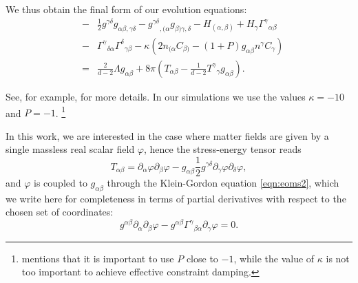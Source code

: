 \documentclass[a4paper,11pt]{article}
\numberwithin{equation}{section}
\begin{document}
We thus obtain the final form of our evolution equations:
\begin{eqnarray}
\label{eqn:efe_gh_modified}
&-& \frac{1}{2} g^{\gamma \delta} g_{\alpha\beta, \gamma \delta} - 
{g^{\gamma\delta}}_{,(\alpha} g_{\beta) \gamma, \delta} - H_{(\alpha, \beta)} + H_\gamma {\Gamma^\gamma}_{\alpha\beta} \nonumber \\
&-& {\Gamma^\gamma}_{\delta \alpha} {\Gamma^\delta}_{\gamma \beta} - \kappa \left( 2 n_{(\alpha} C_{\beta)} - (1+P) g_{\alpha\beta} n^\gamma 
C_\gamma \right) \nonumber \\
&=&   \frac{2}{d-2} \Lambda g_{\alpha\beta} + 8\pi \left( T_{\alpha\beta} - 
\frac{1}{d-2} {T^\gamma}_\gamma g_{\alpha\beta} \right).
\end{eqnarray}

See, for example, \cite{Pretorius:2004jg,Bantilan:2012vu} for more details. 
In our simulations we use the values $\kappa=-10$ and $P=-1$.
\footnote{\cite{Bantilan:2012vu} mentions that it is important to use $P$ close to $-1$, while the value of $\kappa$ is not too important to achieve effective constraint damping.}

In this work, we are interested in the case where matter fields are given by a single massless real scalar field $\varphi$, hence the stress-energy tensor reads
\begin{equation}
\label{eq:KHmomtens}
T_{\alpha\beta}=\partial_\alpha \varphi \partial_\beta \varphi - g_{\alpha\beta} \frac{1}{2} g^{\gamma\delta} \partial_{\gamma} \varphi \partial_{\delta} \varphi,
\end{equation}
and $\varphi$ is coupled to $g_{\alpha\beta}$ through the Klein-Gordon equation \eqref{eqn:eoms2}, which we write here for completeness in terms of partial derivatives with respect to the chosen set of coordinates:
\begin{equation}\label{eqn:eoms2cart}
g^{\alpha\beta} \partial_{\alpha} \partial_{\beta} \varphi -g^{\alpha\beta} \Gamma^{\gamma}{}_{\beta\alpha}\partial_\gamma\varphi= 0.
\end{equation}
\end{document}
